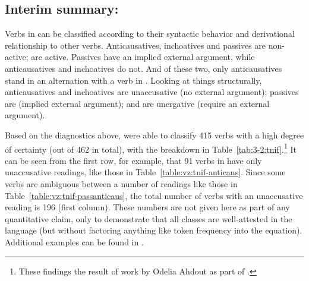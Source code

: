 \begin{exe}
\begin{xlist}
\begin{xlist}
\begin{exe}
\begin{xlist}
\begin{xlist}
\begin{exe}
\begin{xlist}
\begin{xlist}
\begin{exe}
\begin{exe}
\begin{xlist}
\begin{exe}
\begin{exe}
\begin{xlist}
\begin{exe}
\begin{exe}
\begin{exe}
\begin{exe}
\begin{exe}
\begin{xlist}
\begin{exe}
\begin{xlist}
\begin{exe}
\begin{exe}
\begin{xlist}
	\subsection{Interim summary: \tnif} \label{vz:tnif:sum}
Verbs in {\tnif} can be classified according to their syntactic behavior and derivational relationship to other verbs. Anticausatives, inchoatives and passives are non-active;  are active. Passives have an implied external argument, while anticausatives and inchoatives do not. And of these two, only anticausatives stand in an alternation with a verb in {\tkal}. Looking at things structurally, anticausatives and inchoatives are unaccusative (no external argument); passives are  (implied external argument); and  are unergative (require an external argument).

Based on the diagnostics above, \cite{ahdoutkastner19nels} were able to classify 415 verbs with a high degree of certainty (out of 462 in total), with the breakdown in Table~\ref{tab:3-2:tnif}.\footnote{These findings the result of work by Odelia Ahdout as part of \citet{ahdout19phd}.} It can be seen from the first row, for example, that 91 verbs in {\tnif} have only unaccusative readings, like those in Table~\ref{table:vz:tnif-anticaus}. Since some verbs are ambiguous between a number of readings like those in Table~\ref{table:vz:tnif-passanticaus}, the total number of verbs with an unaccusative reading is 196 (first column). These numbers are not given here as part of any quantitative claim, only to demonstrate that all classes are well-attested in the language (but without factoring anything like token frequency into the equation). Additional examples can be found in \cite{ahdoutkastner19nels}.


\end{xlist}
\end{exe}
\end{exe}
\end{xlist}
\end{exe}
\end{xlist}
\end{exe}
\end{exe}
\end{exe}
\end{exe}
\end{exe}
\end{xlist}
\end{exe}
\end{exe}
\end{xlist}
\end{exe}
\end{exe}
\end{xlist}
\end{xlist}
\end{exe}
\end{xlist}
\end{xlist}
\end{exe}
\end{xlist}
\end{xlist}
\end{exe}
